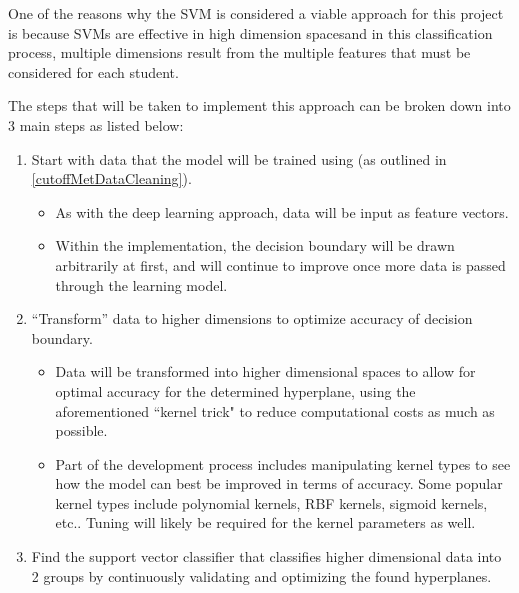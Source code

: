\documentclass{article}
\begin{document}
\begin{normalsize}
        One of the reasons why the SVM is considered a viable approach for this project is because SVMs are effective in high dimension spaces\footnotemark[\value{footnote}] and in this classification process, multiple dimensions result from the multiple features that must be considered for each student.
        
        
        The steps that will be taken to implement this approach can be broken down into 3 main steps as listed below:
        
        \begin{enumerate}
            \item Start with data that the model will be trained using (as outlined in \underline{\ref{cutoffMetDataCleaning}}).
            \begin{itemize}
                \item As with the deep learning approach, data will be input as feature vectors.
                \item Within the implementation, the decision boundary will be drawn arbitrarily at first, and will continue to improve once more data is passed through the learning model.
            \end{itemize}
            \item ``Transform'' data to higher dimensions to optimize accuracy of decision boundary.
                \begin{itemize}
                    \item Data will be transformed into higher dimensional spaces to allow for optimal accuracy for the determined hyperplane, using the aforementioned ``kernel trick" to reduce computational costs as much as possible.
                    \item Part of the development process includes manipulating kernel types to see how the model can best be improved in terms of accuracy. Some popular kernel types include polynomial kernels, RBF kernels, sigmoid kernels, etc.. Tuning will likely be required for the kernel parameters as well.
                \end{itemize}
            \item Find the support vector classifier that classifies higher dimensional data into 2 groups by continuously validating and optimizing the found hyperplanes.
        \end{enumerate}
        

\end{normalsize}
\end{document}
